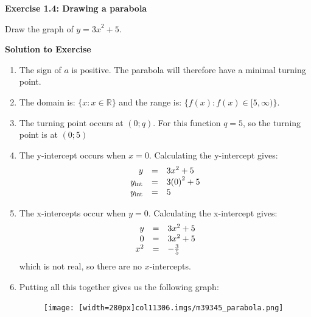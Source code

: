 \begin{mdframed}[linewidth=4, leftmargin=40, rightmargin=40]  
\begin{exercise}
\noindent\textbf{Exercise 1.4: Drawing a parabola}


Draw the graph of $y={3x}^{2}+5$.\par 
\vspace{5pt}
\noindent\textbf{Solution to Exercise }
\begin{enumerate}[noitemsep, label=\textbf{Step} \textbf{\arabic*}. ] 
\leftskip=20pt\rightskip=\leftskip\item The sign of $a$ is positive. The parabola will therefore have a minimal turning point.\item The domain is: $\{x:x\in \mathbb{R}\}$ and the range is: $\{f(x):f(x)\in [5,\infty )\}$.\item The turning point occurs at $(0;q)$. For this function $q=5$, so the turning point is at $(0;5)$\item The y-intercept occurs when $x=0$. Calculating the y-intercept gives:
\nopagebreak\noindent{}
\begin{equation*}
\begin{array}{ccc}\hfill y& =& {3x}^{2}+5\hfill \\ \hfill {y}_{\mathrm{int}}& =& {3(0)}^{2}+5\hfill \\ \hfill {y}_{\mathrm{int}}& =& 5\hfill \end{array}
\end{equation*}
\item The x-intercepts occur when $y=0$. Calculating the x-intercept gives:
\nopagebreak\noindent{}
\begin{equation*}
\begin{array}{ccc}\hfill y& =& {3x}^{2}+5\hfill \\ \hfill 0& =& {3x}^{2}+5\hfill \\ \hfill {x}^{2}& =& -\frac{3}{5}\hfill \end{array}
\end{equation*}
which is not real, so there are no $x$-intercepts.

\item Putting all this together gives us the following graph:
\setcounter{subfigure}{0}
\begin{figure}[H] %
\begin{center}
\label{m39345*uid12459!!!underscore!!!media}\label{m39345*uid12459!!!underscore!!!printimage}\texttt{[image: [width=280px]col11306.imgs/m39345\_parabola.png]} %
\vspace{2pt}
\vspace{.1in}
\end{center}
\end{figure}       
\end{enumerate}
\end{exercise}
\end{mdframed}
